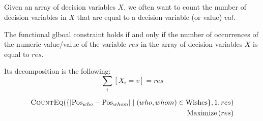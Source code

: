 \documentclass{cons-beamer}
\begin{document}
\subsection{}

\begin{frame}
  Given an array of decision variables $X$, we often want to count
  the number of decision variables in
  $X$ that are equal to a decision variable (or value) $val$.
  \vfill
  
  \begin{definition}
    The  functional glboal constraint holds if and only if the number of occurrences of the numeric value/value of the variable $res$ in the array of decision variables $X$ is equal to $res$.
  \end{definition}\vfill
  
  Its decomposition is the following: \\
  \[
  \sum_{i}  [ X_i = v ]  = res
  \]
  \vfill

  \begin{example}
    \begin{align*}
      \textsc{CountEq}(\{ \left| \text{Pos}_{who} - \text{Pos}_{whom} \right| \mid (who, whom) \in \text{Wishes} \}, 1, res) \\
      \text{Maximize} \left( res \right)
    \end{align*}
  \end{example}
\end{frame}
\end{document}
